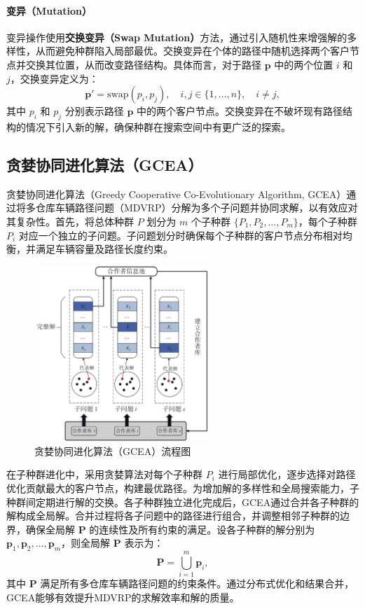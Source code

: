 \documentclass[12pt,a4paper,oneside]{ctexart}
\begin{document}
\paragraph{变异（Mutation）}

变异操作使用\textbf{交换变异（Swap Mutation）}方法，通过引入随机性来增强解的多样性，从而避免种群陷入局部最优。交换变异在个体的路径中随机选择两个客户节点并交换其位置，从而改变路径结构。具体而言，对于路径 $\bm{p}$ 中的两个位置 $i$ 和 $j$，交换变异定义为：
\[
\bm{p}' = \text{swap}(p_i, p_j), \quad i, j \in \{1, \ldots, n\}, \quad i \neq j,
\]
其中 $p_i$ 和 $p_j$ 分别表示路径 $\bm{p}$ 中的两个客户节点。交换变异在不破坏现有路径结构的情况下引入新的解，确保种群在搜索空间中有更广泛的探索。

	
\subsection{贪婪协同进化算法（GCEA）}

贪婪协同进化算法（Greedy Cooperative Co-Evolutionary Algorithm, GCEA）通过将多仓库车辆路径问题（MDVRP）分解为多个子问题并协同求解，以有效应对其复杂性。首先，将总体种群 $P$ 划分为 $m$ 个子种群 $\{P_1, P_2, \ldots, P_m\}$，每个子种群 $P_i$ 对应一个独立的子问题。子问题划分时确保每个子种群的客户节点分布相对均衡，并满足车辆容量及路径长度约束。

\begin{figure}[htbp]
	\centering
	\includegraphics[width=0.6\textwidth]{fig/3.jpg}
	\caption{贪婪协同进化算法（GCEA）流程图}
	\label{fig:3}
\end{figure}

在子种群进化中，采用贪婪算法对每个子种群 $P_i$ 进行局部优化，逐步选择对路径优化贡献最大的客户节点，构建最优路径。为增加解的多样性和全局搜索能力，子种群间定期进行解的交换。各子种群独立进化完成后，GCEA通过合并各子种群的解构成全局解。合并过程将各子问题中的路径进行组合，并调整相邻子种群的边界，确保全局解 $\bm{P}$ 的连续性及所有约束的满足。设各子种群的解分别为 $\bm{p}_1, \bm{p}_2, \ldots, \bm{p}_m$，则全局解 $\bm{P}$ 表示为：
\[
\bm{P} = \bigcup_{i=1}^{m} \bm{p}_i,
\]
其中 $\bm{P}$ 满足所有多仓库车辆路径问题的约束条件。通过分布式优化和结果合并，GCEA能够有效提升MDVRP的求解效率和解的质量。
\end{document}
